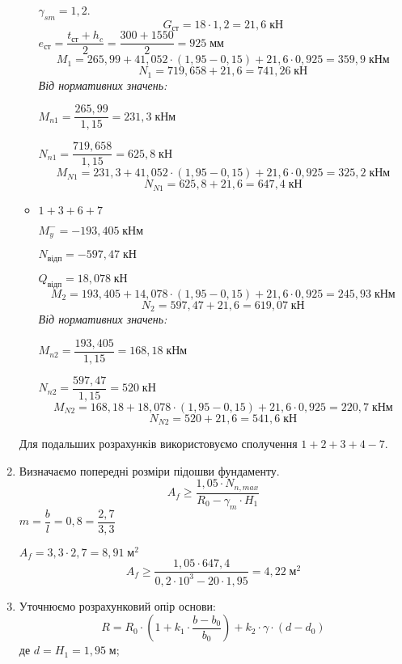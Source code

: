 \documentclass[a4paper,14pt]{article}
\begin{document}
\begin{enumerate}
\begin{itemize}
       $\gamma_{sm} = 1,2$.
       $$G_{\textit{ст}} = 18 \cdot 1,2 = 21,6\;\textit{кН}$$
       $e_{\textit{ст}} = \dfrac{t_{\textit{ст}} + h_c}{2} = \dfrac{300 + 1550}{2} = 925\;\textit{мм}$
       $$M_1 = 265,99 + 41,052 \cdot (1,95 - 0,15) + 21,6 \cdot 0,925 = 359,9\;\textit{кНм}$$
       $$N_1 = 719,658 + 21,6 = 741,26\;\textit{кН}$$
       \textit{Від нормативних значень:}
   
       $M_{n1} = \dfrac{265,99}{1,15} = 231,3\;\textit{кНм}$
   
       $N_{n1} = \dfrac{719,658}{1,15} = 625,8\;\textit{кН}$
       $$M_{N1} = 231,3 + 41,052 \cdot (1,95 - 0,15) + 21,6 \cdot 0,925 = 325,2\;\textit{кНм}$$
       $$N_{N1} = 625,8 + 21,6 = 647,4\;\textit{кН}$$
       \item $1 + 3 + 6 + 7$

        $M_y^- = - 193,405\;\textit{кНм}$
        
        $N_{\textit{відп}} = - 597,47\;\textit{кН}$
   
        $Q_{\textit{відп}} = 18,078\;\textit{кН}$
       $$M_2 = 193,405 + 14,078 \cdot (1,95 - 0,15) + 21,6 \cdot 0,925 = 245,93\;\textit{кНм}$$
       $$N_2 = 597,47 + 21,6 = 619,07\;\textit{кН}$$
       \textit{Від нормативних значень:}
   
       $M_{n2} = \dfrac{193,405}{1,15} = 168,18\;\textit{кНм}$
   
       $N_{n2} = \dfrac{597,47}{1,15} = 520\;\textit{кН}$
       $$M_{N2} = 168,18 + 18,078 \cdot (1,95 - 0,15) + 21,6 \cdot 0,925 = 220,7\;\textit{кНм}$$
       $$N_{N2} = 520 + 21,6 = 541,6\;\textit{кН}$$
    \end{itemize}
     Для подальших розрахунків використовуємо сполучення $1 + 2 + 3 + 4 - 7$.
    \item Визначаємо попередні розміри підошви фундаменту.
    \begin{equation}
        A_f \geqslant \dfrac{1,05 \cdot N_{n,max}}{R_0 - \gamma_m \cdot H_1}
    \end{equation}
     $m = \dfrac{b}{l} = 0,8 = \dfrac{2,7}{3,3}$

     $A_f = 3,3 \cdot 2,7 = 8,91\;\textit{м}^2$
     $$A_f \geqslant \dfrac{1,05 \cdot 647,4}{0,2 \cdot 10^3 - 20 \cdot 1,95} = 4,22\;\textit{м}^2$$
    \item Уточнюємо розрахунковий опір основи:
    \begin{equation}
        R = R_0 \cdot \left(1 + k_1 \cdot \dfrac{b-b_0}{b_0}\right) + k_2 \cdot \gamma \cdot \left(d - d_0\right)
    \end{equation}
    де $d = H_1 = 1,95\;\textit{м}$;


\end{enumerate}
\end{document}
